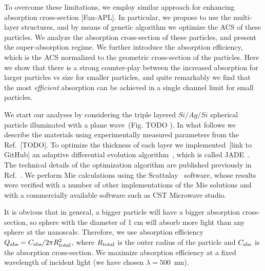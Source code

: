 \documentclass[aps,prl,twocolumn,showpacs,superscriptaddress,groupedaddress]{revtex4-1}
\begin{document}
To overcome these limitations, we employ similar approach for
enhancing absorption cross-section [Fan-APL]. In particular, we
propose to use the multi-layer structures, and by means of genetic
algorithm we optimize the ACS of these particles. We analyze the
absorption cross-section of these particles, and present the
super-absorption regime. We further introduce the absorption
efficiency, which is the ACS normalized to the geometric cross-section
of the particles. Here we show that there is a strong counter-play
between the increased absorption for larger particles vs size for
smaller particles, and quite remarkably we find that the most {\em
  efficient} absorption can be achieved in a single channel limit for
small particles.

We start our analyses by considering the triple layered $Si/Ag/Si$
spherical particle illuminated with a plane wave~(Fig. TODO ). In what
follows we describe the materials using experimentally measured
parameters from the Ref.~[TODO].  To optimize the thickness of each
layer we implemented~[link to GitHub] an adaptive differential
evolution algorithm~\cite{Storn-DE-first-1997}, which is called
JADE~\cite{Jingqiao-JADE-2009}.  The technical details of the
optimization algorithm are published previously in
Ref.~\cite{Ladutenko-2014}. We perform Mie calculations using the
Scattnlay~\cite{Pena-scattnlay-2009} software, whose results were
verified with a number of other implementations of the Mie solutions
and with a commercially available software such as CST Microwave
studio.

It is obvious that in general, a bigger particle will have a bigger
absorption cross-section, so sphere with the diameter of 1 cm will
absorb more light than any sphere at the nanoscale. Therefore, we use
absorption efficiency $Q_{\rm abs}=C_{\rm abs}/2\pi R_{\rm total}^2$,
where $R_{\rm total}$ is the outer radius of the particle and $C_{\rm
  abs}$ is the absorption cross-section. We maximize absorption
efficiency at a fixed wavelength of incident light (we have chosen
$\lambda=500$~nm).
\end{document}
